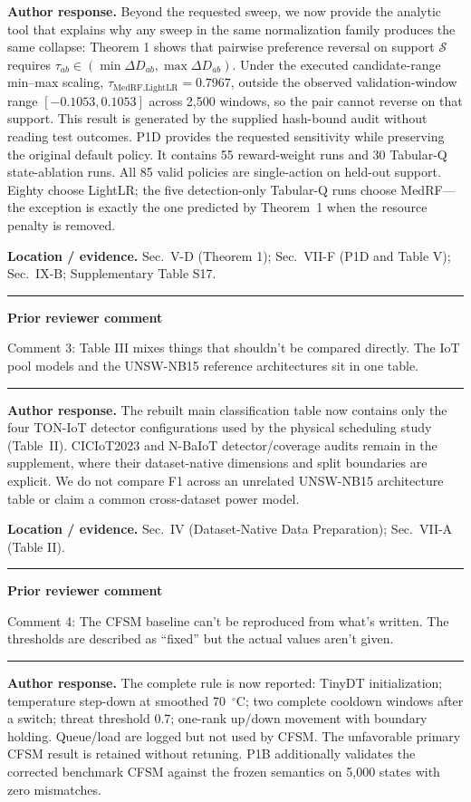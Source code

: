 \documentclass[11pt]{article}
\newenvironment{qbox}
    {\par\vspace{4pt}\noindent\begin{minipage}{\linewidth}\rule{\linewidth}{0.4pt}\par\noindent\textbf{Prior reviewer comment}\par\noindent}
    {\par\rule{\linewidth}{0.4pt}\end{minipage}\par\vspace{4pt}}
\begin{document}
\textbf{Author response.} Beyond the requested sweep, we now provide the analytic tool that explains why any sweep in the same normalization family produces the same collapse: Theorem 1 shows that pairwise preference reversal on support $\mathcal S$ requires $\tau_{ab}\in(\min\Delta D_{ab},\max\Delta D_{ab})$. Under the executed candidate-range min--max scaling, $\tau_{\text{MedRF,LightLR}}=0.7967$, outside the observed validation-window range $[-0.1053,0.1053]$ across 2{,}500 windows, so the pair cannot reverse on that support. This result is generated by the supplied hash-bound audit without reading test outcomes. P1D provides the requested sensitivity while preserving the original default policy. It contains 55 reward-weight runs and 30 Tabular-Q state-ablation runs. All 85 valid policies are single-action on held-out support. Eighty choose LightLR; the five detection-only Tabular-Q runs choose MedRF---the exception is exactly the one predicted by Theorem~1 when the resource penalty is removed.

\textbf{Location / evidence.} Sec.~V-D (Theorem 1); Sec.~VII-F (P1D and Table V); Sec.~IX-B; Supplementary Table S17.

\begin{qbox}
Comment 3: Table III mixes things that shouldn't be compared directly. The IoT pool models and the UNSW-NB15 reference architectures sit in one table.
\end{qbox}

\textbf{Author response.} The rebuilt main classification table now contains only the four TON-IoT detector configurations used by the physical scheduling study (Table~II). CICIoT2023 and N-BaIoT detector/coverage audits remain in the supplement, where their dataset-native dimensions and split boundaries are explicit. We do not compare F1 across an unrelated UNSW-NB15 architecture table or claim a common cross-dataset power model.

\textbf{Location / evidence.} Sec.~IV (Dataset-Native Data Preparation); Sec.~VII-A (Table II).

\begin{qbox}
Comment 4: The CFSM baseline can't be reproduced from what's written. The thresholds are described as ``fixed'' but the actual values aren't given.
\end{qbox}

\textbf{Author response.} The complete rule is now reported: TinyDT initialization; temperature step-down at smoothed 70~$^{\circ}$C; two complete cooldown windows after a switch; threat threshold 0.7; one-rank up/down movement with boundary holding. Queue/load are logged but not used by CFSM. The unfavorable primary CFSM result is retained without retuning. P1B additionally validates the corrected benchmark CFSM against the frozen semantics on 5{,}000 states with zero mismatches.
\end{document}
